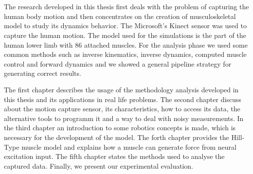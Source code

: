 \thispagestyle{empty}
\clearpage\mbox{}
\thispagestyle{empty}
\clearpage

\section*{\texorpdfstring{}{}}

\en
The research developed in this thesis first deals with the problem of capturing the human body motion and then concentrates on the creation of musculoskeletal model to study its dynamics behavior. The Microsoft's Kinect sensor was used to capture the human motion. The model used for the simulations is the part of the human lower limb with 86 attached muscles. For the analysis phase we used some common methods such as inverse kinematics, inverse dynamics, computed muscle control and forward dynamics and we showed a general pipeline strategy for generating correct results.

The first chapter describes the usage of the methodology analysis developed in this thesis and its applications in real life problems. The second chapter discuss about the motion capture sensor, its characteristics, how to access its data, the alternative tools to programm it and a way to deal with noisy measurements. In the third chapter an introduction to some robotics concepts is made, which is necessary for the development of the model. The forth chapter provides the Hill-Type muscle model and explains how a muscle can generate force from neural excitation input. The fifth chapter states the methods used to analyse the captured data. Finally, we present our experimental evaluation.
\gr

\vfill

\paragraph{\textbf{}}

\thispagestyle{empty}
\clearpage\mbox{}
\thispagestyle{empty} 